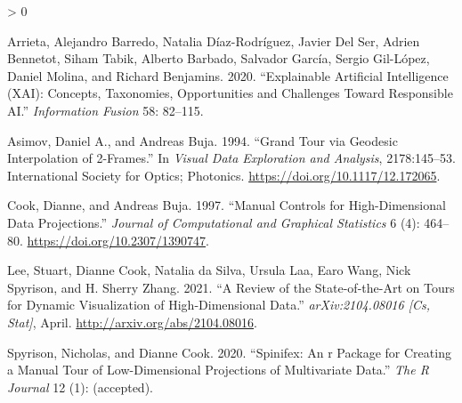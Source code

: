 \documentclass[
]{article}
\newlength{\cslhangindent}
\newenvironment{CSLReferences}[2] %
 {%
  \setlength{\parindent}{0pt}
  \ifodd #1 \everypar{\setlength{\hangindent}{\cslhangindent}}\ignorespaces\fi
  \ifnum #2 > 0
  \setlength{\parskip}{#2\baselineskip}
  \fi
 }%
 {}
\begin{document}
\hypertarget{refs}{}
\begin{CSLReferences}{1}{0}
\leavevmode\hypertarget{ref-arrieta_explainable_2020}{}%
Arrieta, Alejandro Barredo, Natalia Díaz-Rodríguez, Javier Del Ser, Adrien Bennetot, Siham Tabik, Alberto Barbado, Salvador García, Sergio Gil-López, Daniel Molina, and Richard Benjamins. 2020. {``Explainable {Artificial} {Intelligence} ({XAI}): {Concepts}, Taxonomies, Opportunities and Challenges Toward Responsible {AI}.''} \emph{Information Fusion} 58: 82--115.

\leavevmode\hypertarget{ref-asimov_grand_1994}{}%
Asimov, Daniel A., and Andreas Buja. 1994. {``Grand Tour via Geodesic Interpolation of 2-Frames.''} In \emph{Visual Data Exploration and Analysis}, 2178:145--53. International Society for Optics; Photonics. \url{https://doi.org/10.1117/12.172065}.

\leavevmode\hypertarget{ref-cook_manual_1997}{}%
Cook, Dianne, and Andreas Buja. 1997. {``Manual Controls for High-Dimensional Data Projections.''} \emph{Journal of Computational and Graphical Statistics} 6 (4): 464--80. \url{https://doi.org/10.2307/1390747}.

\leavevmode\hypertarget{ref-lee_review_2021}{}%
Lee, Stuart, Dianne Cook, Natalia da Silva, Ursula Laa, Earo Wang, Nick Spyrison, and H. Sherry Zhang. 2021. {``A {Review} of the {State}-of-the-{Art} on {Tours} for {Dynamic} {Visualization} of {High}-{Dimensional} {Data}.''} \emph{arXiv:2104.08016 {[}Cs, Stat{]}}, April. \url{http://arxiv.org/abs/2104.08016}.

\leavevmode\hypertarget{ref-spyrison_spinifex_2020}{}%
Spyrison, Nicholas, and Dianne Cook. 2020. {``Spinifex: An r Package for Creating a Manual Tour of Low-Dimensional Projections of Multivariate Data.''} \emph{The R Journal} 12 (1): (accepted).

\end{CSLReferences}
\end{document}
